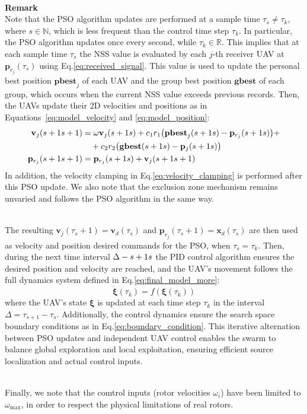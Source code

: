 \documentclass[main]{subfiles}
\begin{document}
\noindent\\
\textbf{Remark}\noindent\\
Note that the PSO algorithm updates are performed at a sample time 
$\tau_s \neq \tau_k$, where $s \in \mathbb{N}$, which is less 
frequent than the control time step $\tau_k$.
In particular, the PSO algorithm updates once every second, while 
$\tau_k \in \mathbb{R}$.
This implies that at each sample time $\tau_s$ the NSS value is 
evaluated by each $j$-th receiver UAV at $\mathbf{p}_{r_j}(\tau_s)$ using 
Eq.\ref{eq:received_signal}.
This value is used to update the personal best position $\mathbf{pbest}_{j}$
of each UAV and the group best position $\mathbf{gbest}$ of each group,
which occurs when the current NSS value exceeds previous records. 
Then, the UAVs update their 2D velocities and positions
as in Equations~\ref{eq:model_velocity} and \ref{eq:model_position}:
\begin{align}
 \mathbf{v}_{j}(\tau_s+1) &= \omega \mathbf{v}_{j}(\tau_s) 
 + c_1 r_1 \big(\mathbf{pbest}_{j}(\tau_s) - \mathbf{p}_{r_j}(\tau_s)\big) + \notag \\
    &\quad + c_2 r_2 \big(\mathbf{gbest}(\tau_s) - \mathbf{p}_{j}(\tau_s)\big) \label{eq:model_velocity2} \\
 \mathbf{p}_{r_j}(\tau_s + 1) &= \mathbf{p}_{r_j}(\tau_s) + \mathbf{v}_{j}(\tau_s+1) \label{eq:model_position2}
\end{align}
In addition, the velocity clamping in Eq.\ref{eq:velocity_clamping} is performed after
this PSO update.
We also note that the exclusion zone mechanism remains unvaried
and follows the PSO algorithm in the same way.

\noindent\\
The resulting $\mathbf{v}_{j}(\tau_s+1) = \mathbf{v}_d(\tau_s)$ and $\mathbf{p}_{r_j}(\tau_s + 1) = \mathbf{x}_d(\tau_s)$
are then used as velocity and position desired commands for the PSO, when 
$\tau_s = \tau_k$.
Then, during the next time interval $\Delta \def \tau_{s+1} - \tau_s$ the PID
control algorithm ensures the desired position and velocity are reached,
and the UAV's movement follows the full dynamics system defined in 
Eq.\ref{eq:final_model_more}:
\begin{equation}
 \dot{\mathbf{\xi}}(\tau_k) = f(\mathbf{\xi}(\tau_k))
\end{equation}
where the UAV’s state $\mathbf{\xi}$ is updated at each time step $\tau_k$ in the 
interval $\Delta = \tau_{s+1} - \tau_s$.
Additionally, the control dynamics ensure the 
search space boundary conditions as in
Eq.\ref{eq:boundary_condition}.
This iterative alternation between PSO updates and 
independent UAV 
control enables the swarm to balance global 
exploration and local exploitation, 
ensuring efficient source localization and actual 
control inputs.

\noindent\\
Finally, we note that the comtrol inputs (rotor velocities
$\omega_i$) have been limited to $\omega_\text{max}$, 
in order to respect the physical limitations of real 
rotors. 
\end{document}
